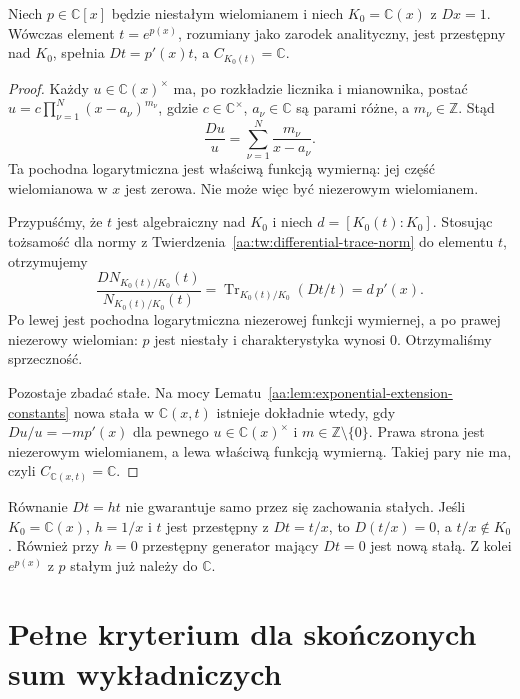 \begin{lemat}
\label{aa:lem:exp-polynomial-constant-field}
Niech $p\in\mathbb C[x]$ będzie niestałym
wielomianem i niech $K_0=\mathbb C(x)$
z $Dx=1$. Wówczas element $t=e^{p(x)}$,
rozumiany jako zarodek analityczny,
jest przestępny nad $K_0$, spełnia
$Dt=p'(x)t$, a $C_{K_0(t)}=\mathbb C$.
\end{lemat}
\begin{proof}
Każdy $u\in\mathbb C(x)^\times$ ma,
po rozkładzie licznika i mianownika,
postać $u=c\prod_{\nu=1}^{N}(x-a_\nu)^{m_\nu}$,
gdzie $c\in\mathbb C^\times$, $a_\nu\in\mathbb C$
są parami różne, a $m_\nu\in\mathbb Z$.
Stąd
\[
 \frac{Du}{u}=\sum_{\nu=1}^N\frac{m_\nu}{x-a_\nu}.
\]
Ta pochodna logarytmiczna jest właściwą
funkcją wymierną: jej część wielomianowa
w $x$ jest zerowa. Nie może więc być
niezerowym wielomianem.

Przypuśćmy, że $t$ jest algebraiczny nad
$K_0$ i niech $d=[K_0(t):K_0]$.
Stosując tożsamość dla normy z
Twierdzenia~\ref{aa:tw:differential-trace-norm}
do elementu $t$, otrzymujemy
\[
 \frac{D N_{K_0(t)/K_0}(t)}
        {N_{K_0(t)/K_0}(t)}
 =\operatorname{Tr}_{K_0(t)/K_0}(Dt/t)
 =d\,p'(x).
\]
Po lewej jest pochodna logarytmiczna
niezerowej funkcji wymiernej,
a po prawej niezerowy wielomian:
$p$ jest niestały i charakterystyka wynosi $0$.
Otrzymaliśmy sprzeczność.

Pozostaje zbadać stałe. Na mocy
Lematu~\ref{aa:lem:exponential-extension-constants}
nowa stała w $\mathbb C(x,t)$ istnieje
dokładnie wtedy, gdy
$Du/u=-m p'(x)$ dla pewnego
$u\in\mathbb C(x)^\times$ i
$m\in\mathbb Z\setminus\{0\}$.
Prawa strona jest niezerowym wielomianem,
a lewa właściwą funkcją wymierną.
Takiej pary nie ma, czyli
$C_{\mathbb C(x,t)}=\mathbb C$.
\end{proof}

\begin{uwaga}
\label{aa:uw:hyperexponential-obstructions}
Równanie $Dt=ht$ nie gwarantuje samo
przez się zachowania stałych.
Jeśli $K_0=\mathbb C(x)$, $h=1/x$
i $t$ jest przestępny z $Dt=t/x$,
to $D(t/x)=0$, a $t/x\notin K_0$.
Również przy $h=0$ przestępny generator
mający $Dt=0$ jest nową stałą.
Z kolei $e^{p(x)}$ z $p$ stałym
już należy do $\mathbb C$.
\end{uwaga}

\section{Pełne kryterium dla skończonych sum wykładniczych}

